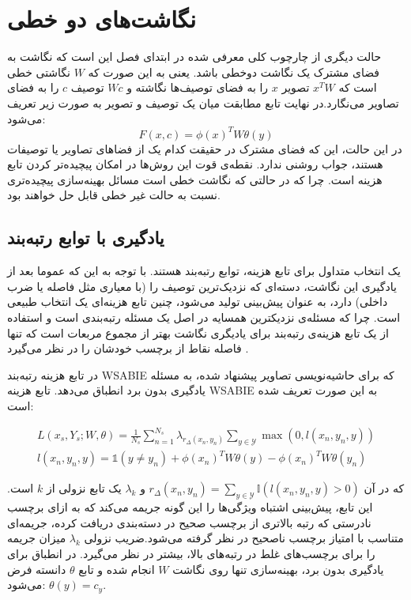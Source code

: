\section{نگاشت‌های دو خطی}
حالت دیگری از چارچوب کلی معرفی شده در ابتدای فصل این است که نگاشت به فضای مشترک یک نگاشت دوخطی باشد. یعنی به این صورت که $W$ نگاشتی خطی است که $x^TW$ تصویر $x$ را به فضای توصیف‌ها نگاشته و $Wc$ توصیف $c$ را به فضای تصاویر می‌نگارد.در نهایت تابع مطابقت میان یک توصیف و تصویر به صورت زیر تعریف می‌شود:
\begin{equation}\label{bilinear}
F(x,c) = \phi(x)^TW \theta(y)
\end{equation}
 در این حالت، این که فضای مشترک در حقیقت کدام یک از فضاهای تصاویر یا توصیفات هستند، جواب روشنی ندارد. نقطه‌ی قوت این روش‌ها در امکان پیچیده‌تر کردن تابع هزینه است. چرا که در حالتی که نگاشت خطی است مسائل بهینه‌سازی پیچیده‌تری نسبت به حالت غیر خطی قابل حل خواهند بود.

 \subsection{یادگیری با توابع رتبه‌بند}
  یک انتخاب متداول برای تابع هزینه، توابع رتبه‌بند
هستند. با توجه به این که عموما بعد از یادگیری این نگاشت، دسته‌ای که نزدیک‌ترین توصیف را (با معیاری مثل فاصله یا ضرب داخلی) دارد، به عنوان پیش‌بینی تولید می‌شود،
 چنین تابع هزینه‌ای یک انتخاب طبیعی است. چرا که مسئله‌ی نزدیکترین همسایه در اصل یک مسئله رتبه‌بندی
 است و استفاده از یک تابع هزینه‌ی رتبه‌بند برای یادیگری نگاشت بهتر از مجموع مربعات است که تنها فاصله نقاط از برچسب خودشان را در نظر می‌گیرد \cite{devise}.

در
\cite{akata2013}
 تابع هزینه رتبه‌بند WSABIE
\cite{wsabie}
که برای حاشیه‌نویسی تصاویر پیشنهاد شده، به مسئله یادگیری بدون برد انطباق می‌دهد.
تابع هزینه WSABIE به این صورت تعریف شده است:

\begin{align}
L(x_s, Y_s ; W, \theta) = \frac{1}{N_s} \sum_{n=1}^{N_s} \lambda_{r_\Delta (x_n, y_n)} \sum_{y \in \mathcal{Y}} \max (0, \mathit{l}(x_n, y_n, y) ) \\
\mathit{l}(x_n,y_n,y) = \mathds{1}(y \neq y_n) + \phi(x_n)^TW \theta(y) - \phi(x_n)^TW\theta(y_n) \label{l_loss}
\end{align}

که در آن
$ r_\Delta (x_n, y_n) =  \sum_{y \in \mathcal{Y}} \mathbb{I}(\mathit{l}(x_n, y_n, y)  > 0) $
 و $\lambda_k$ یک تابع نزولی از $k$ است. این تابع، پیش‌بینی اشتباه ویژگی‌ها را  این گونه جریمه می‌کند که به ازای برچسب نادرستی که رتبه بالاتری از برچسب صحیح در دسته‌بندی دریافت کرده، جریمه‌ای متناسب با امتیاز برچسب ناصحیح در نظر گرفته می‌شود.ضریب نزولی $\lambda_k$ میزان جریمه را برای برچسب‌های غلط در رتبه‌های بالا، بیشتر در نظر می‌گیرد. در انطباق برای یادگیری بدون برد، بهینه‌سازی تنها روی نگاشت $W$ انجام شده و  تابع $\theta$ دانسته فرض می‌شود:
$\theta(y) = c_y$.


